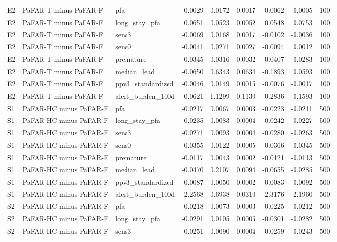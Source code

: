 \begin{table}[tbp]
{\begin{tabular}{lllrrrrrr}
E2 & PaFAR-T minus PaFAR-F & pfa & -0.0029 & 0.0172 & 0.0017 & -0.0062 & 0.0005 & 100 \\
E2 & PaFAR-T minus PaFAR-F & long\_stay\_pfa & 0.0651 & 0.0523 & 0.0052 & 0.0548 & 0.0753 & 100 \\
E2 & PaFAR-T minus PaFAR-F & sens3 & -0.0069 & 0.0168 & 0.0017 & -0.0102 & -0.0036 & 100 \\
E2 & PaFAR-T minus PaFAR-F & sens0 & -0.0041 & 0.0271 & 0.0027 & -0.0094 & 0.0012 & 100 \\
E2 & PaFAR-T minus PaFAR-F & premature & -0.0345 & 0.0316 & 0.0032 & -0.0407 & -0.0283 & 100 \\
E2 & PaFAR-T minus PaFAR-F & median\_lead & -0.0650 & 0.6343 & 0.0634 & -0.1893 & 0.0593 & 100 \\
E2 & PaFAR-T minus PaFAR-F & ppv3\_standardized & -0.0046 & 0.0149 & 0.0015 & -0.0076 & -0.0017 & 100 \\
E2 & PaFAR-T minus PaFAR-F & alert\_burden\_100d & -0.0621 & 1.1299 & 0.1130 & -0.2836 & 0.1593 & 100 \\
S1 & PaFAR-HC minus PaFAR-F & pfa & -0.0217 & 0.0067 & 0.0003 & -0.0223 & -0.0211 & 500 \\
S1 & PaFAR-HC minus PaFAR-F & long\_stay\_pfa & -0.0235 & 0.0083 & 0.0004 & -0.0242 & -0.0227 & 500 \\
S1 & PaFAR-HC minus PaFAR-F & sens3 & -0.0271 & 0.0093 & 0.0004 & -0.0280 & -0.0263 & 500 \\
S1 & PaFAR-HC minus PaFAR-F & sens0 & -0.0355 & 0.0122 & 0.0005 & -0.0366 & -0.0345 & 500 \\
S1 & PaFAR-HC minus PaFAR-F & premature & -0.0117 & 0.0043 & 0.0002 & -0.0121 & -0.0113 & 500 \\
S1 & PaFAR-HC minus PaFAR-F & median\_lead & -0.0470 & 0.2107 & 0.0094 & -0.0655 & -0.0285 & 500 \\
S1 & PaFAR-HC minus PaFAR-F & ppv3\_standardized & 0.0087 & 0.0050 & 0.0002 & 0.0083 & 0.0092 & 500 \\
S1 & PaFAR-HC minus PaFAR-F & alert\_burden\_100d & -2.2568 & 0.6938 & 0.0310 & -2.3176 & -2.1960 & 500 \\
S2 & PaFAR-HC minus PaFAR-F & pfa & -0.0218 & 0.0073 & 0.0003 & -0.0225 & -0.0212 & 500 \\
S2 & PaFAR-HC minus PaFAR-F & long\_stay\_pfa & -0.0291 & 0.0105 & 0.0005 & -0.0301 & -0.0282 & 500 \\
S2 & PaFAR-HC minus PaFAR-F & sens3 & -0.0251 & 0.0090 & 0.0004 & -0.0259 & -0.0243 & 500 \\

\end{tabular}}
\end{table}
